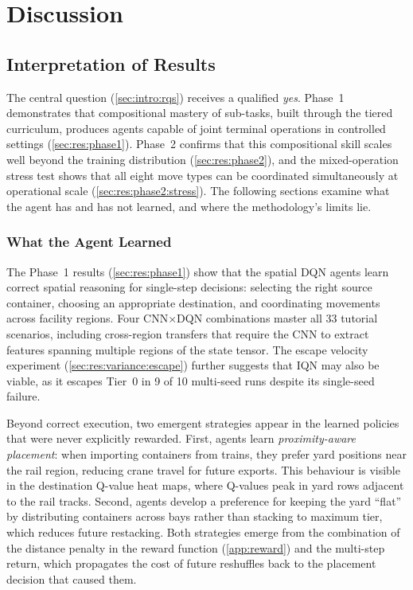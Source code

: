 \chapter{Discussion}
\label{ch:discussion}

\section{Interpretation of Results}
\label{sec:disc:interpretation}

The central question (\cref{sec:intro:rqs}) receives a qualified \emph{yes}. Phase~1 demonstrates that compositional mastery of sub-tasks, built through the tiered curriculum, produces agents capable of joint terminal operations in controlled settings (\cref{sec:res:phase1}). Phase~2 confirms that this compositional skill scales well beyond the training distribution (\cref{sec:res:phase2}), and the mixed-operation stress test shows that all eight move types can be coordinated simultaneously at operational scale (\cref{sec:res:phase2:stress}). The following sections examine what the agent has and has not learned, and where the methodology's limits lie.

\subsection{What the Agent Learned}
\label{sec:disc:interpretation:learned}

The Phase~1 results (\cref{sec:res:phase1}) show that the spatial DQN agents learn correct spatial reasoning for single-step decisions: selecting the right source container, choosing an appropriate destination, and coordinating movements across facility regions. Four CNN$\times$DQN combinations master all 33 tutorial scenarios, including cross-region transfers that require the CNN to extract features spanning multiple regions of the state tensor. The escape velocity experiment (\cref{sec:res:variance:escape}) further suggests that IQN may also be viable, as it escapes Tier~0 in 9 of 10 multi-seed runs despite its single-seed failure.

Beyond correct execution, two emergent strategies appear in the learned policies that were never explicitly rewarded. First, agents learn \emph{proximity-aware placement}: when importing containers from trains, they prefer yard positions near the rail region, reducing crane travel for future exports. This behaviour is visible in the destination Q-value heat maps, where Q-values peak in yard rows adjacent to the rail tracks. Second, agents develop a preference for keeping the yard ``flat'' by distributing containers across bays rather than stacking to maximum tier, which reduces future restacking. Both strategies emerge from the combination of the distance penalty in the reward function (\cref{app:reward}) and the multi-step return, which propagates the cost of future reshuffles back to the placement decision that caused them.

